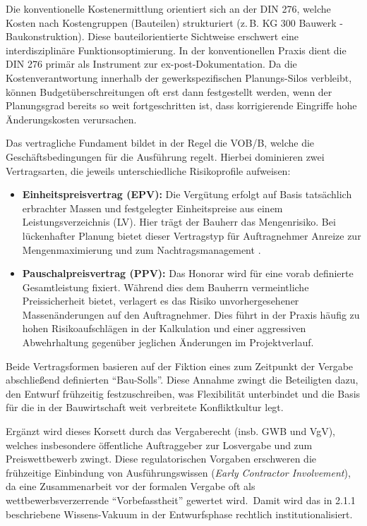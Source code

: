 Die konventionelle Kostenermittlung orientiert sich an der DIN 276, welche Kosten nach Kostengruppen (Bauteilen) strukturiert (z.\,B. KG 300 Bauwerk - Baukonstruktion).\autocite[Vgl.][S.~13]{din_276_din_2018} Diese bauteilorientierte Sichtweise erschwert eine interdisziplinäre Funktionsoptimierung. In der konventionellen Praxis dient die DIN 276 primär als Instrument zur ex-post-Dokumentation. Da die Kostenverantwortung innerhalb der gewerkspezifischen Planungs-Silos verbleibt, können Budgetüberschreitungen oft erst dann festgestellt werden, wenn der Planungsgrad bereits so weit fortgeschritten ist, dass korrigierende Eingriffe hohe Änderungskosten verursachen. \autocite[Vgl.][S.~3 f]{becker_integrierte_2022}

Das vertragliche Fundament bildet in der Regel die \acs{VOB}/B, welche die Geschäftsbedingungen für die Ausführung regelt. Hierbei dominieren zwei Vertragsarten, die jeweils unterschiedliche Risikoprofile aufweisen:

\begin{itemize}
    \item \textbf{Einheitspreisvertrag (EPV):} Die Vergütung erfolgt auf Basis tatsächlich erbrachter Massen und festgelegter Einheitspreise aus einem Leistungsverzeichnis (LV). Hier trägt der Bauherr das Mengenrisiko. Bei lückenhafter Planung bietet dieser Vertragstyp für Auftragnehmer Anreize zur Mengenmaximierung und zum Nachtragsmanagement \autocite[Vgl.][§~2~Abs.~2]{vobb_din_2016}.
    \item \textbf{Pauschalpreisvertrag (PPV):} Das Honorar wird für eine vorab definierte Gesamtleistung fixiert. Während dies dem Bauherrn vermeintliche Preissicherheit bietet, verlagert es das Risiko unvorhergesehener Massenänderungen auf den Auftragnehmer. Dies führt in der Praxis häufig zu hohen Risikoaufschlägen in der Kalkulation und einer aggressiven Abwehrhaltung gegenüber jeglichen Änderungen im Projektverlauf.\autocite[Vgl.][§~2~Abs.~7]{vobb_din_2016}
\end{itemize}

Beide Vertragsformen basieren auf der Fiktion eines zum Zeitpunkt der Vergabe abschließend definierten \enquote{Bau-Solls}. Diese Annahme zwingt die Beteiligten dazu, den Entwurf frühzeitig festzuschreiben, was Flexibilität unterbindet und die Basis für die in der Bauwirtschaft weit verbreitete Konfliktkultur legt.

Ergänzt wird dieses Korsett durch das Vergaberecht (insb. GWB und VgV), welches insbesondere öffentliche Auftraggeber zur Losvergabe und zum Preiswettbewerb zwingt. Diese regulatorischen Vorgaben erschweren die frühzeitige Einbindung von Ausführungswissen (\textit{Early Contractor Involvement}), da eine Zusammenarbeit vor der formalen Vergabe oft als wettbewerbsverzerrende \enquote{Vorbefasstheit} gewertet wird. \autocite[Vgl.][§~97~Abs.~1~u.~2]{noauthor_gesetz_2013}\,\autocite[Vgl.][§~7~Abs.~1~u.~2]{vgv_verordnung_2016}Damit wird das in 2.1.1 beschriebene Wissens-Vakuum in der Entwurfsphase rechtlich institutionalisiert.

